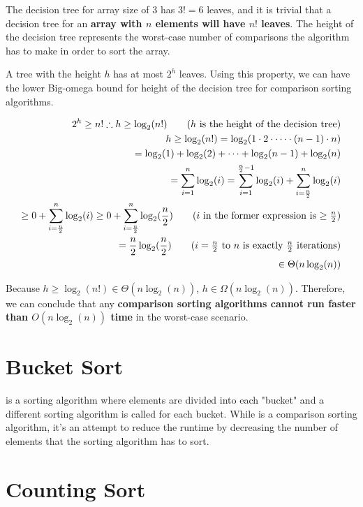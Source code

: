 The decision tree for array size of 3 has $3! = 6$ leaves, and it is trivial that a decision tree for an \textbf{array with $n$ elements will have $n!$ leaves}. The height of the decision tree represents the worst-case number of comparisons the algorithm has to make in order to sort the array.

A tree with the height $h$ has at most $2^{h}$ leaves. Using this property, we can have the lower Big-omega bound for height of the decision tree for comparison sorting algorithms.

\begin{align*}
  2^{h} \geq n! \therefore h \geq \log_{2}(n!) \tag{$h$ is the height of the decision tree} \\
  h \geq \log_{2}(n!) = \log_{2}(1 \cdot 2 \cdot \cdots \cdot (n - 1) \cdot n) \\
  = \log_{2}(1) + \log_{2}(2) + \cdots + \log_{2}(n - 1) + \log_{2}(n) \\
  = \sum_{i = 1}^{n} \log_{2}(i) = \sum_{i = 1}^{\frac{n}{2} - 1} \log_{2}(i) + \sum_{i = \frac{n}{2}}^{n} \log_{2}(i) \\
  \geq 0 + \sum_{i = \frac{n}{2}}^{n} \log_{2}(i) \geq 0 + \sum_{i = \frac{n}{2}}^{n} \log_{2}(\frac{n}{2}) \tag{$i$ in the former expression is $\geq \frac{n}{2}$} \\
  = \frac{n}{2} \log_{2}(\frac{n}{2}) \tag{$i = \frac{n}{2}$ to $n$ is exactly $\frac{n}{2}$ iterations} \\
  \in \Theta(n \log_{2}(n))
\end{align*}

Because $h \geq \log_{2}(n!) \in \Theta(n \log_{2}(n))$, $h \in \Omega(n \log_{2}(n))$. Therefore, we can conclude that any \textbf{comparison sorting algorithms cannot run faster than $O(n \log_{2}(n))$ time} in the worst-case scenario.

\section{Bucket Sort}

 is a sorting algorithm where elements are divided into each "bucket" and a different sorting algorithm is called for each bucket. While  is a comparison sorting algorithm, it's an attempt to reduce the runtime by decreasing the number of elements that the sorting algorithm has to sort.

\section{Counting Sort}


